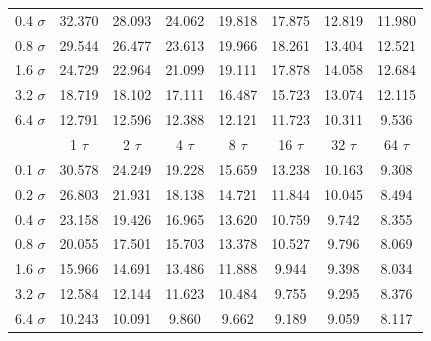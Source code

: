 \documentclass[preprint,12pt]{elsarticle}
\begin{document}
\begin{table}
{\begin{tabular}{c || c c c c c c c}
0.4 $\sigma$	&	32.370 	&	28.093 	&	24.062 	&	19.818 	&	17.875 	&	 12.819 	&	11.980 	\\
0.8 $\sigma$	&	29.544 	&	26.477 	&	23.613 	&	19.966 	&	18.261 	&	 13.404 	&	12.521 	\\
1.6 $\sigma$	&	24.729 	&	22.964 	&	21.099 	&	19.111 	&	17.878 	&	 14.058 	&	12.684 	\\
3.2 $\sigma$	&	18.719 	&	18.102 	&	17.111 	&	16.487 	&	15.723 	&	 13.074 	&	12.115 	\\
6.4 $\sigma$	&	12.791 	&	12.596 	&	12.388 	&	12.121 	&	11.723 	&	 10.311 	&	9.536 	\\
\hline
\hline			
	&	1 $\tau$	&	2 $\tau$	&	4 $\tau$	&	8 $\tau$	&	16 $\tau$	 &	32 $\tau$	&	64 $\tau$	\\
\hline
0.1 $\sigma$	&	30.578 	&	24.249 	&	19.228 	&	15.659 	&	13.238 	&	 10.163 	&	9.308 	\\
0.2 $\sigma$	&	26.803 	&	21.931 	&	18.138 	&	14.721 	&	11.844 	&	 10.045 	&	8.494 	\\
0.4 $\sigma$	&	23.158 	&	19.426 	&	16.965 	&	13.620 	&	10.759 	&	 9.742 	&	8.355 	\\
0.8 $\sigma$	&	20.055 	&	17.501 	&	15.703 	&	13.378 	&	10.527 	&	 9.796 	&	8.069 	\\
1.6 $\sigma$	&	15.966 	&	14.691 	&	13.486 	&	11.888 	&	9.944 	&	 9.398 	&	8.034 	\\
3.2 $\sigma$	&	12.584 	&	12.144 	&	11.623 	&	10.484 	&	9.755 	&	 9.295 	&	8.376 	\\
6.4 $\sigma$	&	10.243 	&	10.091 	&	9.860 	&	9.662 	&	9.189 	&	 9.059 	&	8.117 	\\
\hline

\end{tabular}}
\end{table}
\end{document}
